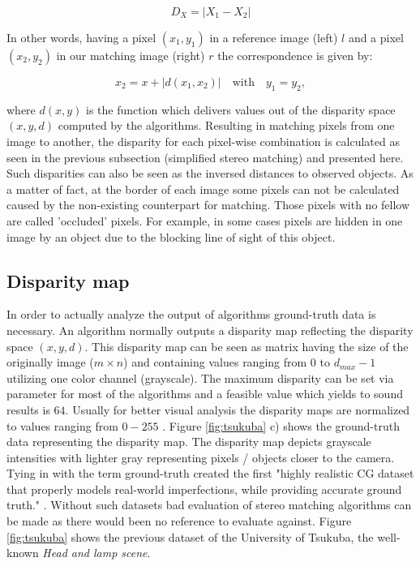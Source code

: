 \begin{equation}
  D_X = |X_1 - X_2|
\end{equation}

\noindent In other words, having a pixel $(x_1,y_1)$ in a reference image (left) $l$ and a pixel $(x_2,y_2)$ in our matching image (right) $r$ the correspondence is given by:

\begin{equation}
  x_2 = x + |d(x_1,x_2)|\quad \textrm{with}\quad y_1 = y_2,
\end{equation}

\noindent where $d(x,y)$ is the function which delivers values out of the disparity space $(x,y,d)$ computed by the algorithms.
\newline\newline\noindent Resulting in matching pixels from one image to another, the disparity for each pixel-wise combination is calculated as seen in the previous subsection (simplified stereo matching) and presented here.
Such disparities can also be seen as the inversed distances to observed objects.
As a matter of fact, at the border of each image some pixels can not be calculated caused by the non-existing counterpart for matching.
Those pixels with no fellow are called 'occluded' pixels.
For example, in some cases pixels are hidden in one image by an object due to the blocking line of sight of this object.

\subsection*{Disparity map}

In order to actually analyze the output of algorithms ground-truth data is necessary.
An algorithm normally outputs a disparity map reflecting the disparity space $(x,y,d)$.
This disparity map can be seen as matrix having the size of the originally image ($m \times n$) and containing values ranging from $0$ to $d_{max} - 1$ utilizing one color channel (grayscale).
The maximum disparity can be set via parameter for most of the algorithms and a feasible value which yields to sound results is $64$.
Usually for better visual analysis the disparity maps are normalized to values ranging from $0 - 255$ \citep{martull2012realistic, cyganek2011introduction, scharstein2002taxonomy}.
Figure \ref{fig:tsukuba} c) shows the ground-truth data representing the disparity map.
The disparity map depicts grayscale intensities with lighter gray representing pixels / objects closer to the camera.
\newline\newline\noindent Tying in with the term ground-truth \citeauthor{martull2012realistic} created the first "highly realistic CG dataset that properly models real-world imperfections, while providing accurate ground truth." \citep{martull2012realistic}.
Without such datasets bad evaluation of stereo matching algorithms can be made as there would been no reference to evaluate against.
Figure \ref{fig:tsukuba} shows the previous dataset of the University of Tsukuba, the well-known \textit{Head and lamp scene}.

